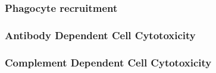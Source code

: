 \subsubsection{Phagocyte recruitment}

\subsubsection{Antibody Dependent Cell Cytotoxicity}

\subsubsection{Complement Dependent Cell Cytotoxicity}
